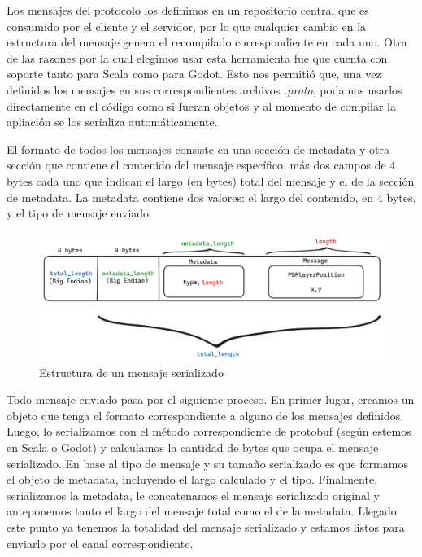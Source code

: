 Los mensajes del protocolo los definimos en un repositorio central que es consumido por el cliente y el servidor, por lo que cualquier cambio
en la estructura del mensaje genera el recompilado correspondiente en cada uno.
Otra de las razones por la cual elegimos usar esta herramienta fue que cuenta con soporte tanto para Scala como para Godot.
Esto nos permitió que, una vez definidos los mensajes en sus correspondientes archivos \textit{.proto}, podamos usarlos
directamente en el código como si fueran objetos y al momento de compilar la apliación se los serializa automáticamente.

El formato de todos los mensajes consiste en una sección de metadata y otra sección que contiene el contenido del mensaje específico,
más dos campos de 4 bytes cada uno que indican el largo (en bytes) total del mensaje y el de la sección de metadata.
La metadata contiene dos valores: el largo del contenido, en 4 bytes, y el tipo de mensaje enviado.

\begin{figure}[htbp]
    \centering
    \includegraphics[width=1.0\textwidth]{../assets/protobuf.png}
    \caption{Estructura de un mensaje serializado}
\end{figure}

\newpage

Todo mensaje enviado pasa por el siguiente proceso. En primer lugar, creamos un objeto que tenga el formato correspondiente a alguno de los
mensajes definidos. Luego, lo serializamos con el método correspondiente de protobuf (según estemos en Scala o Godot) y
calculamos la cantidad de bytes que ocupa el mensaje serializado. En base al tipo de mensaje y su tamaño serializado es que formamos el objeto de metadata, incluyendo el largo calculado y el tipo.
Finalmente, serializamos la metadata, le concatenamos el mensaje serializado original y anteponemos tanto el largo del mensaje total como el de la metadata.
Llegado este punto ya tenemos la totalidad del mensaje serializado y estamos listos para enviarlo por el canal correspondiente.

